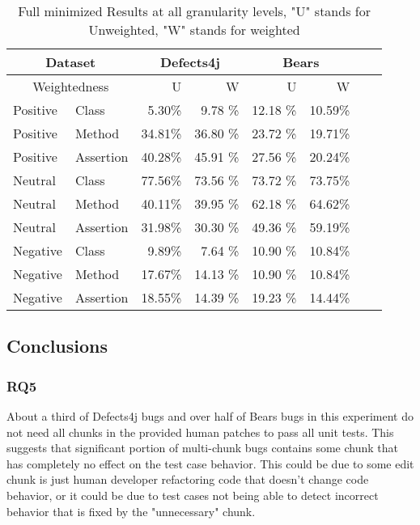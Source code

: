 \documentclass[sigconf, timestamp-false, anonymous=true]{acmart}
\begin{document}
\begin{table}
{\begin{center}
\begin{tabular}{| l | l | r | r | r | r | r | r |}
\hline
\multicolumn{2}{|c|}{Dataset} &\multicolumn{2}{|c|}{Defects4j} & \multicolumn{2}{|c|}{Bears} \\
\hline
\multicolumn{2}{|c|}{Weightedness} & U & W & U & W  \\
\hline
Positive & Class & 5.30\% & 9.78 \% & 12.18 \% & 10.59\%  \\
Positive & Method & 34.81\% & 36.80 \% & 23.72 \% & 19.71\%  \\
Positive & Assertion & 40.28\% & 45.91 \% & 27.56 \% & 20.24\%  \\ 
\hline
Neutral & Class & 77.56\% & 73.56 \% & 73.72 \% & 73.75\% \\
Neutral & Method & 40.11\% & 39.95 \% & 62.18 \% & 64.62\%  \\
Neutral & Assertion & 31.98\% & 30.30 \% & 49.36 \% &  59.19\%  \\ 
\hline
Negative & Class & 9.89\% & 7.64 \% & 10.90 \% & 10.84\%  \\
Negative & Method & 17.67\% & 14.13 \% & 10.90 \% & 10.84\%  \\
Negative & Assertion & 18.55\% & 14.39 \% & 19.23 \% &  14.44\%  \\ 
\hline
\end{tabular}
\end{center}}
\caption{Full minimized Results at all granularity levels, "U" stands for Unweighted, "W" stands for weighted}
\end{table}

    
\subsection{Conclusions}

\subsubsection{RQ5}
About a third of Defects4j bugs and over half of
Bears bugs in this experiment do not need all chunks in the provided human patches to pass
all unit tests. This suggests that significant portion of multi-chunk bugs contains some
chunk that has completely no effect on the test case behavior. This could be due to some
edit chunk is just human developer refactoring code that doesn't change code behavior,
or it could be due to test cases not being able to detect incorrect behavior that is fixed
by the "unnecessary" chunk.
\end{document}
